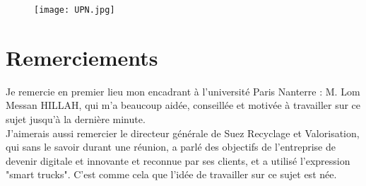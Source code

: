 \documentclass[a4paper,12pt]{report}
\begin{document}
\begin{titlepage}



\begin {figure}[H]
\hspace*{0mm}\vfill
\begin{center} \texttt{[image: UPN.jpg]} \end{center}
\vfill \hspace*{0mm}

 \end{figure}
 

\vfill %

\end{titlepage}



\chapter*{Remerciements}
Je remercie en premier lieu mon encadrant à l'université Paris Nanterre : M. Lom Messan HILLAH, qui m'a beaucoup aidée, conseillée et motivée à travailler sur ce sujet jusqu'à la dernière minute.\\

J'aimerais aussi remercier le directeur générale de Suez Recyclage et Valorisation, qui sans le savoir durant une réunion, a parlé des objectifs de l'entreprise de devenir digitale et innovante et reconnue par ses clients, et a utilisé l'expression "smart trucks". C'est comme cela que l'idée de travailler sur ce sujet est née.\\
\end{document}
